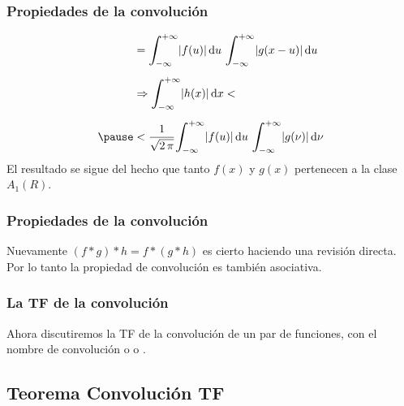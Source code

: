 \begin{frame}
\frametitle{Propiedades de la convolución}
\begin{eqnarray*}
\begin{aligned}  
&= \scaleint{6ex}_{\bs -\infty}^{+\infty} \abs{f (u)} \dd{u} \, \scaleint{6ex}_{\bs -\infty}^{+\infty} \abs{g (x - u)} \dd{u} \\[0.5em]
&\Rightarrow \scaleint{6ex}_{\bs -\infty}^{+\infty} \abs{h(x)} \dd{x} < \\[0.5em] \pause
&< \dfrac{1}{\sqrt{2 \, \pi}} \scaleint{6ex}_{\bs -\infty}^{+\infty} \abs{f (u)} \dd{u} \, \scaleint{6ex}_{\bs -\infty}^{+\infty} \abs{g (\nu)} \dd{\nu}
\end{aligned}
\end{eqnarray*}
\pause
El resultado se sigue del hecho que tanto $f (x)$ y $g (x)$ pertenecen a la clase $A_{1}(R)$.
\end{frame}
\begin{frame}
\frametitle{Propiedades de la convolución}
Nuevamente $(f * g) * h = f * (g * h)$ es cierto haciendo una revisión directa.
\\
\bigskip
\pause
Por lo tanto la propiedad de convolución es también asociativa.
\end{frame}
\begin{frame}
\frametitle{La TF de la convolución}
Ahora discutiremos la TF de la convolución de un par de funciones, con el nombre de convolución o  o .
\end{frame}

\subsection{Teorema Convolución TF}


